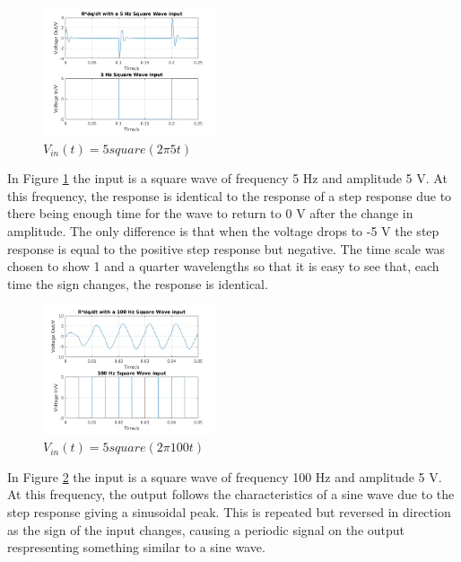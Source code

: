 \documentclass[11pt,a4paper]{article}
\begin{document}
\begin{figure}
    \vspace{-40mm}
  		\includegraphics[width=0.45\textwidth]{Ex3_Figs/5Squ1.png}
	\vspace{-3mm}
  	\caption{$V_{in}(t)= 5square(2 \pi 5t)$}
  	\label{fig:ex3g5}
\end{figure}

\vspace{3mm}In Figure \ref{fig:ex3g5} the input is a square wave of frequency 5 Hz and amplitude 5 V. At this frequency, the response is identical to the response of a step response due to there being enough time for the wave to return to 0 V after the change in amplitude. The only difference is that when the voltage drops to -5 V the step response is equal to the positive step response but negative. The time scale was chosen to show 1 and a quarter wavelengths so that it is easy to see that, each time the sign changes, the response is identical.

\begin{figure}
    \vspace{-35mm}
  		\includegraphics[width=0.45\textwidth]{Ex3_Figs/100Squ1.png}
	\vspace{-3mm}
  	\caption{$V_{in}(t)= 5square(2 \pi 100t)$}
  	\label{fig:ex3g6}
\end{figure}

\vspace{5mm}In Figure \ref{fig:ex3g6} the input is a square wave of frequency 100 Hz and amplitude 5 V. At this frequency, the output follows the characteristics of a sine wave due to the step response giving a sinusoidal peak. This is repeated but reversed in direction as the sign of the input changes, causing a periodic signal on the output respresenting something similar to a sine wave.
\end{document}

